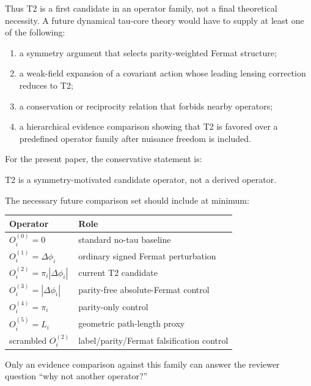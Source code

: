 \documentclass[11pt]{article}
\newenvironment{Shaded}{}{}
\newcommand{\NormalTok}[1]{#1}
\newcounter{none} %
\providecommand{\tightlist}{%
  \setlength{\itemsep}{0pt}\setlength{\parskip}{0pt}}
\begin{document}
Thus T2 is a first candidate in an operator family, not a final
theoretical necessity. A future dynamical tau-core theory would have to
supply at least one of the following:

\begin{enumerate}
\def\labelenumi{\arabic{enumi}.}
\tightlist
\item
  a symmetry argument that selects parity-weighted Fermat structure;
\item
  a weak-field expansion of a covariant action whose leading lensing
  correction reduces to T2;
\item
  a conservation or reciprocity relation that forbids nearby operators;
\item
  a hierarchical evidence comparison showing that T2 is favored over a
  predefined operator family after nuisance freedom is included.
\end{enumerate}

For the present paper, the conservative statement is:

\begin{Shaded}
\begin{Highlighting}[]
\NormalTok{T2 is a symmetry{-}motivated candidate operator, not a derived operator.}
\end{Highlighting}
\end{Shaded}

The necessary future comparison set should include at minimum:

{\def\LTcaptype{none} %
\begin{longtable}[]{@{}ll@{}}
\toprule\noalign{}
Operator & Role \\
\midrule\noalign{}
\endhead
\bottomrule\noalign{}
\endlastfoot
\(O^{(0)}_i = 0\) & standard no-tau baseline \\
\(O^{(1)}_i = \Delta \phi_i\) & ordinary signed Fermat perturbation \\
\(O^{(2)}_i = \pi_i |\Delta \phi_i|\) & current T2 candidate \\
\(O^{(3)}_i = |\Delta \phi_i|\) & parity-free absolute-Fermat control \\
\(O^{(4)}_i = \pi_i\) & parity-only control \\
\(O^{(5)}_i = L_i\) & geometric path-length proxy \\
scrambled \(O^{(2)}_i\) & label/parity/Fermat falsification control \\
\end{longtable}
}

Only an evidence comparison against this family can answer the reviewer
question ``why not another operator?''
\end{document}
